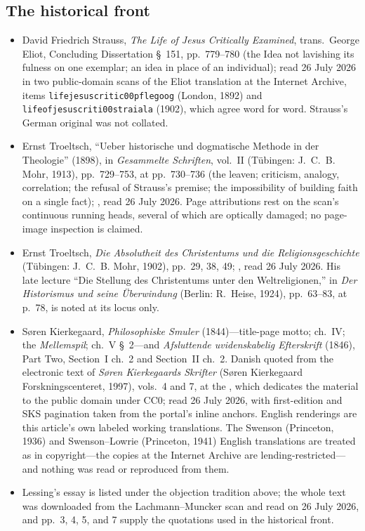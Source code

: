 \subsection*{The historical front}

{\fontsize{8.6}{9.6}\selectfont
\begin{itemize}[itemsep=0pt,parsep=0pt,topsep=0.05em]
\item David Friedrich Strauss, \emph{The Life of Jesus Critically Examined}, trans.\ George Eliot, Concluding Dissertation \S~151, pp.~779--780 (the Idea not lavishing its fulness on one exemplar; an idea in place of an individual); read 26 July 2026 in two public-domain scans of the Eliot translation at the Internet Archive, items \texttt{lifejesuscritic00pflegoog} (London, 1892) and \texttt{lifeofjesuscriti00straiala} (1902), which agree word for word. Strauss's German original was not collated.
\item Ernst Troeltsch, ``Ueber historische und dogmatische Methode in der Theologie'' (1898), in \emph{Gesammelte Schriften}, vol.~II (T\"ubingen: J.~C.~B. Mohr, 1913), pp.~729--753, at pp.~730--736 (the leaven; criticism, analogy, correlation; the refusal of Strauss's premise; the impossibility of building faith on a single fact); , read 26 July 2026. Page attributions rest on the scan's continuous running heads, several of which are optically damaged; no page-image inspection is claimed.
\item Ernst Troeltsch, \emph{Die Absolutheit des Christentums und die Religionsgeschichte} (T\"ubingen: J.~C.~B. Mohr, 1902), pp.~29, 38, 49; , read 26 July 2026. His late lecture ``Die Stellung des Christentums unter den Weltreligionen,'' in \emph{Der Historismus und seine \"Uberwindung} (Berlin: R.~Heise, 1924), pp.~63--83, at p.~78, is noted at its locus only.
\item S\o ren Kierkegaard, \emph{Philosophiske Smuler} (1844)---title-page motto; ch.~IV; the \emph{Mellemspil}; ch.~V \S~2---and \emph{Afsluttende uvidenskabelig Efterskrift} (1846), Part Two, Section~I ch.~2 and Section~II ch.~2. Danish quoted from the electronic text of \emph{S\o ren Kierkegaards Skrifter} (S\o ren Kierkegaard Forskningscenteret, 1997), vols.~4 and 7, at the , which dedicates the material to the public domain under CC0; read 26 July 2026, with first-edition and SKS pagination taken from the portal's inline anchors. English renderings are this article's own labeled working translations. The Swenson (Princeton, 1936) and Swenson--Lowrie (Princeton, 1941) English translations are treated as in copyright---the copies at the Internet Archive are lending-restricted---and nothing was read or reproduced from them.
\item Lessing's essay is listed under the objection tradition above; the whole text was downloaded from the Lachmann--Muncker scan and read on 26 July 2026, and pp.~3, 4, 5, and 7 supply the quotations used in the historical front.
\end{itemize}}

